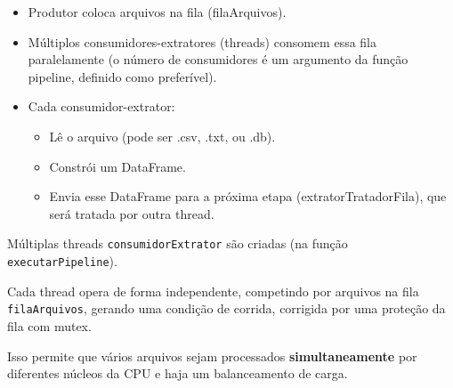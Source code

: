\documentclass[a4paper,12pt]{article}
\begin{document}
\begin{itemize}
    \item Produtor coloca arquivos na fila (filaArquivos).

    \item  Múltiplos consumidores-extratores (threads) consomem essa fila paralelamente (o número de consumidores é um argumento da função pipeline, definido como preferível).

    \item  Cada consumidor-extrator:
    \begin{itemize}
        \item Lê o arquivo (pode ser .csv, .txt, ou .db).
        \item Constrói um DataFrame.
        \item Envia esse DataFrame para a próxima etapa (extratorTratadorFila), que será tratada por outra thread.
    \end{itemize}

\end{itemize}

Múltiplas threads \texttt{consumidorExtrator} são criadas (na função \texttt{executarPipeline}).

Cada thread opera de forma independente, competindo por arquivos na fila \texttt{filaArquivos}, gerando uma condição de corrida, corrigida por uma proteção da fila com mutex.
 
Isso permite que vários arquivos sejam processados \textbf{simultaneamente} por diferentes núcleos da CPU e haja um balanceamento de carga.
\\
\end{document}
